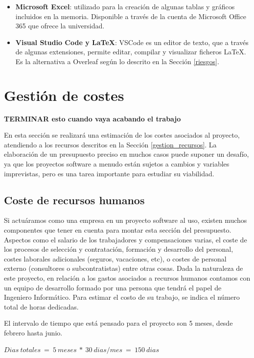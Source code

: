 \begin{itemize}
    \item \textbf{Microsoft Excel}: utilizado para la creación de algunas tablas y gráficos incluidos en la memoria. Disponible a través de la cuenta de Microsoft Office 365 que ofrece la universidad.

    \item \textbf{Visual Studio Code y LaTeX}: VSCode es un editor de texto, que a través de algunas extensiones, permite editar, compilar y visualizar ficheros LaTeX. Es la alternativa a Overleaf según lo descrito en la Sección \ref{riesgos}. 

    
    
\end{itemize}

\section{Gestión de costes}
\textbf{TERMINAR esto cuando vaya acabando el trabajo}

En esta sección se realizará una estimación de los costes asociados al proyecto, atendiendo a los recursos descritos en la Sección \ref{gestion_recursos}. La elaboración de un presupuesto preciso en muchos casos puede suponer un desafío, ya que los proyectos software a menudo están sujetos a cambios y variables imprevistas, pero es una tarea importante para estudiar su viabilidad. 

\subsection{Coste de recursos humanos}
Si actuáramos como una empresa en un proyecto software al uso, existen muchos componentes que tener en cuenta para montar esta sección del presupuesto. Aspectos como el salario de los trabajadores y compensaciones varias, el coste de los procesos de selección y contratación, formación y desarrollo del personal, costes laborales adicionales (seguros, vacaciones, etc), o costes de personal externo (consultores o subcontratistas) entre otras cosas.
Dada la naturaleza de este proyecto, en relación a los gastos asociados a recursos humanos contamos con un equipo de desarrollo formado por una persona que tendrá el papel de Ingeniero Informático. Para estimar el costo de su trabajo, se indica el número total de horas dedicadas.

El intervalo de tiempo que está pensado para el proyecto son 5 meses, desde febrero hasta junio. 

\begin{center}
    $Dias\ totales\ =\ 5\ meses\ *\ 30\ dias / mes\ =\ 150\ dias$    
\end{center}

